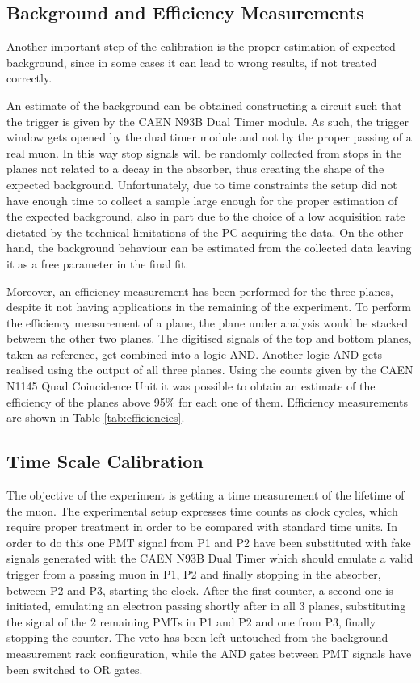 \documentclass[../main.tex]{subfiles}
\begin{document}
\subsection{Background and Efficiency Measurements} \label{subsec:bkg}
Another important step of the calibration is the proper estimation of expected background, since in some cases it can lead to wrong results, if not treated correctly.

An estimate of the background can be obtained constructing a circuit such that the trigger is given by the CAEN N93B Dual Timer module. As such, the trigger window gets opened by the dual timer module and not by the proper passing of a real muon. In this way stop signals will be randomly collected from stops in the planes not related to a decay in the absorber, thus creating the shape of the expected background. Unfortunately, due to time constraints the setup did not have enough time to collect a sample large enough for the proper estimation of the expected background, also in part due to the choice of a low acquisition rate dictated by the technical limitations of the PC acquiring the data. On the other hand, the background behaviour can be estimated from the collected data leaving it as a free parameter in the final fit.

Moreover, an efficiency measurement has been performed for the three planes, despite it not having applications in the remaining of the experiment. To perform the efficiency measurement of a plane, the plane under analysis would be stacked between the other two planes. The digitised signals of the top and bottom planes, taken as reference, get combined into a logic AND. Another logic AND gets realised using the output of all three planes. Using the counts given by the CAEN N1145 Quad Coincidence Unit it was possible to obtain an estimate of the efficiency of the planes above 95\% for each one of them. Efficiency measurements are shown in Table \ref{tab:efficiencies}.

\subsection{Time Scale Calibration}
The objective of the experiment is getting a time measurement of the lifetime of the muon. The experimental setup expresses time counts as clock cycles, which require proper treatment in order to be compared with standard time units. In order to do this one PMT signal from P1 and P2 have been substituted with fake signals generated with the CAEN N93B Dual Timer which should emulate a valid trigger from a passing muon in P1, P2 and finally stopping in the absorber, between P2 and P3, starting the clock. After the first counter, a second one is initiated, emulating an electron passing shortly after in all 3 planes, substituting the signal of the 2 remaining PMTs in P1 and P2 and one from P3, finally stopping the counter. The veto has been left untouched from the background measurement rack configuration, while the AND gates between PMT signals have been switched to OR gates. 
\end{document}
